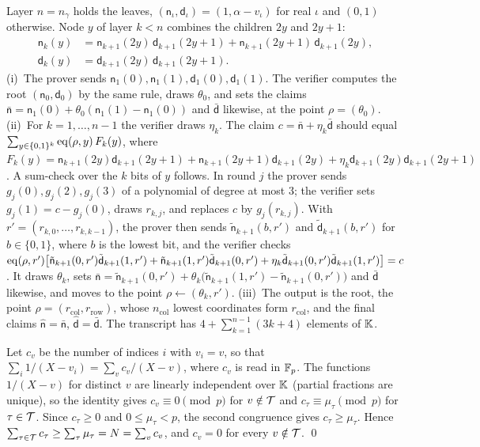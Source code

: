  Layer $n = n_\gamma$ holds the leaves, $(\mathsf
n_\iota, \mathsf d_\iota) = (1, \alpha - v_\iota)$ for real $\iota$ and $(0, 1)$ otherwise. Node
$y$ of layer $k < n$ combines the children $2y$ and $2y+1$:
\[
  \begin{aligned}
    \mathsf n_k(y) &= \mathsf n_{k+1}(2y)\,\mathsf d_{k+1}(2y{+}1) + \mathsf n_{k+1}(2y{+}1)\,
      \mathsf d_{k+1}(2y), \\
    \mathsf d_k(y) &= \mathsf d_{k+1}(2y)\,\mathsf d_{k+1}(2y{+}1).
  \end{aligned}
\]
(i)~The prover sends $\mathsf n_1(0), \mathsf n_1(1), \mathsf d_1(0), \mathsf d_1(1)$. The
verifier computes the root $(\mathsf n_0, \mathsf d_0)$ by the same rule, draws $\theta_0$, and
sets the claims $\bar{\mathsf n} = \mathsf n_1(0) + \theta_0(\mathsf n_1(1) - \mathsf n_1(0))$
and $\bar{\mathsf d}$ likewise, at the point $\rho = (\theta_0)$.
(ii)~For $k = 1, \dots, n-1$ the verifier draws $\eta_k$. The claim $c = \bar{\mathsf n} +
\eta_k \bar{\mathsf d}$ should equal $\sum_{y \in \{0,1\}^k} \mathrm{eq}(\rho, y)\, F_k(y)$, where
$F_k(y) = \mathsf n_{k+1}(2y)\mathsf d_{k+1}(2y{+}1) + \mathsf n_{k+1}(2y{+}1)\mathsf d_{k+1}(2y)
+ \eta_k \mathsf d_{k+1}(2y)\mathsf d_{k+1}(2y{+}1)$. A sum-check over the $k$ bits of $y$
follows. In round $j$ the prover sends $g_j(0), g_j(2), g_j(3)$ of a polynomial of degree at most
3; the verifier sets $g_j(1) = c - g_j(0)$, draws $r_{k,j}$, and replaces $c$ by $g_j(r_{k,j})$.
With $r' = (r_{k,0}, \dots, r_{k,k-1})$, the prover then sends $\tilde{\mathsf n}_{k+1}(b, r')$
and $\tilde{\mathsf d}_{k+1}(b, r')$ for $b \in \{0, 1\}$, where $b$ is the lowest bit, and the
verifier checks $\mathrm{eq}(\rho, r') \big[\tilde{\mathsf n}_{k+1}(0,r')\tilde{\mathsf d}_{k+1}(1,r') +
\tilde{\mathsf n}_{k+1}(1,r')\tilde{\mathsf d}_{k+1}(0,r') + \eta_k \tilde{\mathsf
d}_{k+1}(0,r')\tilde{\mathsf d}_{k+1}(1,r')\big] = c$. It draws $\theta_k$, sets $\bar{\mathsf
n} = \tilde{\mathsf n}_{k+1}(0,r') + \theta_k\big(\tilde{\mathsf n}_{k+1}(1,r') - \tilde{\mathsf
n}_{k+1}(0,r')\big)$ and $\bar{\mathsf d}$ likewise, and moves to the point $\rho \leftarrow
(\theta_k, r')$.
(iii)~The output is the root, the point $\rho = (r_{\mathrm{col}}, r_{\mathrm{row}})$, whose
$n_{\mathrm{col}}$ lowest coordinates form $r_{\mathrm{col}}$, and the final claims $\hat{\mathsf
n} = \bar{\mathsf n}$, $\hat{\mathsf d} = \bar{\mathsf d}$. The transcript has $4 + \sum_{k=1}^{n-1}
(3k+4)$ elements of $\mathbb{K}$.

 Let $c_v$ be the number of indices $i$ with $v_i = v$,
so that $\sum_i 1/(X - v_i) = \sum_v c_v/(X - v)$, where $c_v$ is read in $\mathbb{F}_p$. The functions $1/(X
- v)$ for distinct $v$ are linearly independent over $\mathbb{K}$ (partial fractions are unique), so the
identity gives $c_v \equiv 0 \pmod p$ for $v \notin \mathcal{T}$ and $c_\tau \equiv \mu_\tau \pmod p$ for
$\tau \in \mathcal{T}$. Since $c_\tau \ge 0$ and $0 \le \mu_\tau < p$, the second congruence gives $c_\tau
\ge \mu_\tau$. Hence $\sum_{\tau \in \mathcal{T}} c_\tau \ge \sum_\tau \mu_\tau = N = \sum_v c_v$, and
$c_v = 0$ for every $v \notin \mathcal{T}$. \qed

